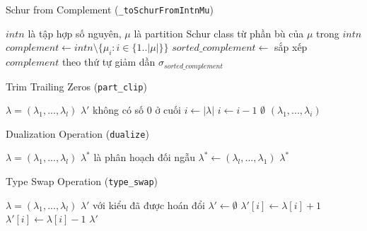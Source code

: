 \begin{algorithm}[H]
\caption{Schur from Complement (\texttt{\_toSchurFromIntnMu})}
\begin{algorithmic}[1]
\REQUIRE $intn$ là tập hợp số nguyên, $\mu$ là partition
\ENSURE Schur class từ phần bù của $\mu$ trong $intn$
\STATE $complement \gets intn \setminus \{\mu_i : i \in \{1..|\mu|\}\}$
\STATE $sorted\_complement \gets$ sắp xếp $complement$ theo thứ tự giảm dần
\RETURN $\sigma_{sorted\_complement}$
\end{algorithmic}
\end{algorithm}

\begin{algorithm}[H]
\caption{Trim Trailing Zeros (\texttt{part\_clip})}
\begin{algorithmic}[1]
\REQUIRE $\lambda = (\lambda_1, ..., \lambda_l)$
\ENSURE $\lambda'$ không có số 0 ở cuối
\STATE $i \gets |\lambda|$
\STATE $i \gets i - 1$
\ENDWHILE
{}
\RETURN $\emptyset$
\ENDIF
\RETURN $(\lambda_1, ..., \lambda_i)$
\end{algorithmic}
\end{algorithm}


\begin{algorithm}[H]
\caption{Dualization Operation (\texttt{dualize})}
\begin{algorithmic}[1]
\REQUIRE $\lambda = (\lambda_1, ..., \lambda_l)$
\ENSURE $\lambda^*$ là phân hoạch đối ngẫu
\STATE $\lambda^* \gets (\lambda_l, ..., \lambda_1)$
\RETURN $\lambda^*$
\end{algorithmic}
\end{algorithm}


\begin{algorithm}[H]
\caption{Type Swap Operation (\texttt{type\_swap})}
\begin{algorithmic}[1]
\REQUIRE $\lambda = (\lambda_1, ..., \lambda_l)$
\ENSURE $\lambda'$ với kiểu đã được hoán đổi
\STATE $\lambda' \gets \emptyset$
        \STATE $\lambda'[i] \gets \lambda[i] + 1$
    \ELSE
        \STATE $\lambda'[i] \gets \lambda[i] - 1$
    \ENDIF
\ENDFOR
\RETURN $\lambda'$
\end{algorithmic}
\end{algorithm}
